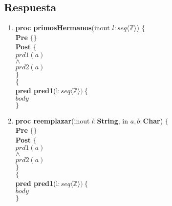\documentclass[a4paper]{article}
\begin{document}
\subsection*{Respuesta}
	\begin{enumerate}[label=\alph*)]
		\item
			
			\textbf{proc primosHermanos}(inout $l:seq\langle \mathbb{Z}\rangle$) $\{$\smallskip \\
			\hspace*{6mm} \textbf{Pre }$\{ \}$\smallskip \\
			\hspace*{6mm} \textbf{Post }$\{$\\
			\hspace*{6mm} $prd1(a)$\\
			\hspace*{6mm} $\wedge$\\
			\hspace*{6mm} $prd2(a)$\\
			\hspace*{6mm} $\}$\\
			$\{$\smallskip \\
			
			\textbf{pred pred1}(l$: seq\langle \mathbb{Z}\rangle)\ \{$\smallskip \\
			\hspace*{6mm}$body$\\
			$\}$			
			
		\item
			
			\textbf{proc reemplazar}(inout $l:$\textbf{String}, in $a,b:$\textbf{Char}) 
			$\{$\smallskip \\
			\hspace*{6mm} \textbf{Pre }$\{ \}$\smallskip \\
			\hspace*{6mm} \textbf{Post }$\{$\\
			\hspace*{6mm} $prd1(a)$\\
			\hspace*{6mm} $\wedge$\\
			\hspace*{6mm} $prd2(a)$\\
			\hspace*{6mm} $\}$\\
			$\{$\smallskip \\
			
			\textbf{pred pred1}(l$: seq\langle \mathbb{Z}\rangle)\ \{$\smallskip \\
			\hspace*{6mm}$body$\\
			$\}$	
			

\end{enumerate}
\end{document}
